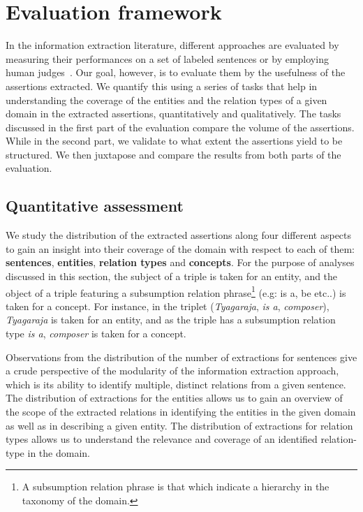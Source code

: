 \documentclass{llncs}
\begin{document}
\section{Evaluation framework}
\label{sec:framework}

In the information extraction literature, different approaches are evaluated by measuring their performances on a set of labeled sentences or by employing human judges~\cite{Fader2011a,Mausam2012a}. Our goal, however, is to evaluate them by the usefulness of the assertions extracted. We quantify this using a series of tasks that help in understanding the coverage of the entities and the relation types of a given domain in the extracted assertions, quantitatively and qualitatively. The tasks discussed in the first part of the evaluation compare the volume of the assertions. While in the second part, we validate to what extent the assertions yield to be structured. We then juxtapose and compare the results from both parts of the evaluation.

\subsection{Quantitative assessment}
We study the distribution of the extracted assertions along four different aspects to gain an insight into their coverage of the domain with respect to each of them: \textbf{sentences}, \textbf{entities}, \textbf{relation types} and \textbf{concepts}. For the purpose of analyses discussed in this section, the subject of a triple is taken for an entity, and the object of a triple featuring a subsumption relation phrase\footnote{A subsumption relation phrase is that which indicate a hierarchy in the taxonomy of the domain.} (e.g: is a, be etc..) is taken for a concept. For instance, in the triplet (\textit{Tyagaraja}, \textit{is a}, \textit{composer}), \textit{Tyagaraja} is taken for an entity, and as the triple has a subsumption relation type \textit{is a}, \textit{composer} is taken for a concept.

Observations from the distribution of the number of extractions for sentences give a crude perspective of the modularity of the information extraction approach, which is its ability to identify multiple, distinct relations from a given sentence. The distribution of extractions for the entities allows us to gain an overview of the scope of the extracted relations in identifying the entities in the given domain as well as in describing a given entity. The distribution of extractions for relation types allows us to understand the relevance and coverage of an identified relation-type in the domain. 
\end{document}
